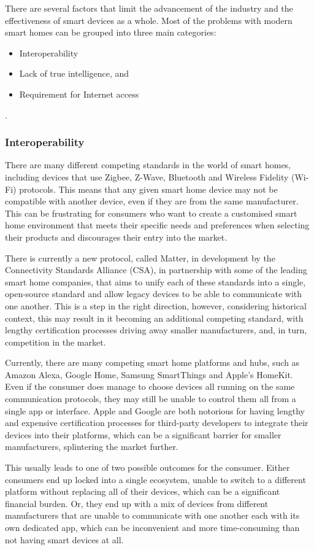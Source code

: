 There are several factors that limit the advancement of the industry and the effectiveness of smart devices as a whole.
Most of the problems with modern smart homes can be grouped into three main categories:
\begin{itemize}
    \item Interoperability
    \item Lack of true intelligence, and
    \item Requirement for Internet access
\end{itemize}
\cite{Wils15}.

\subsubsection{Interoperability}
There are many different competing standards in the world of smart homes, including devices that use Zigbee, Z-Wave, Bluetooth and Wireless Fidelity (Wi-Fi) protocols.
This means that any given smart home device may not be compatible with another device, even if they are from the same manufacturer.
This can be frustrating for consumers who want to create a customised smart home environment that meets their specific needs and preferences when selecting their products and discourages their entry into the market.

There is currently a new protocol, called Matter, in development by the Connectivity Standards Alliance (CSA), in partnership with some of the leading smart home companies, that aims to unify each of these standards into a single, open-source standard and allow legacy devices to be able to communicate with one another.
This is a step in the right direction, however, considering historical context, this may result in it becoming an additional competing standard, with lengthy certification processes driving away smaller manufacturers, and, in turn, competition in the market.

Currently, there are many competing smart home platforms and hubs, such as Amazon Alexa, Google Home, Samsung SmartThings and Apple's HomeKit.
Even if the consumer does manage to choose devices all running on the same communication protocols, they may still be unable to control them all from a single app or interface.
Apple and Google are both notorious for having lengthy and expensive certification processes for third-party developers to integrate their devices into their platforms, which can be a significant barrier for smaller manufacturers, splintering the market further.

This usually leads to one of two possible outcomes for the consumer.
Either consumers end up locked into a single ecosystem, unable to switch to a different platform without replacing all of their devices, which can be a significant financial burden.
Or, they end up with a mix of devices from different manufacturers that are unable to communicate with one another each with its own dedicated app, which can be inconvenient and more time-consuming than not having smart devices at all.


